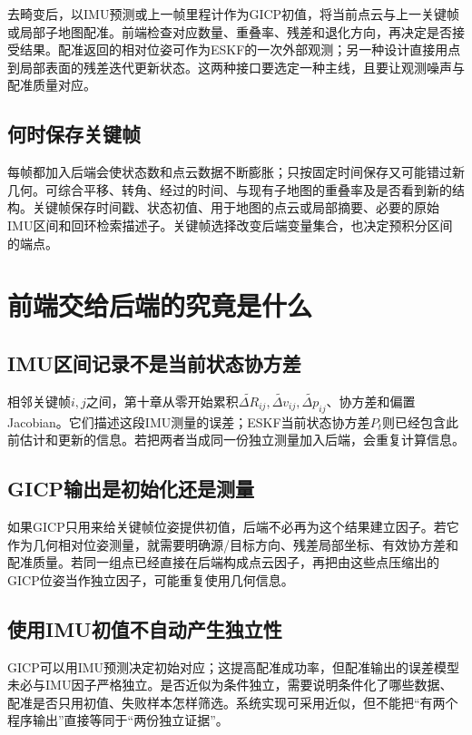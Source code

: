 去畸变后，以IMU预测或上一帧里程计作为GICP初值，将当前点云与上一关键帧或局部子地图配准。前端检查对应数量、重叠率、残差和退化方向，再决定是否接受结果。配准返回的相对位姿可作为ESKF的一次外部观测；另一种设计直接用点到局部表面的残差迭代更新状态。这两种接口要选定一种主线，且要让观测噪声与配准质量对应。

\subsection{何时保存关键帧}

每帧都加入后端会使状态数和点云数据不断膨胀；只按固定时间保存又可能错过新几何。可综合平移、转角、经过的时间、与现有子地图的重叠率及是否看到新的结构。关键帧保存时间戳、状态初值、用于地图的点云或局部摘要、必要的原始IMU区间和回环检索描述子。关键帧选择改变后端变量集合，也决定预积分区间的端点。

\section{前端交给后端的究竟是什么}

\subsection{IMU区间记录不是当前状态协方差}

相邻关键帧$i,j$之间，第十章从零开始累积$\widetilde{\Delta R}_{ij},\widetilde{\Delta v}_{ij},\widetilde{\Delta p}_{ij}$、协方差和偏置Jacobian。它们描述这段IMU测量的误差；ESKF当前状态协方差$P_t$则已经包含此前估计和更新的信息。若把两者当成同一份独立测量加入后端，会重复计算信息。

\subsection{GICP输出是初始化还是测量}

如果GICP只用来给关键帧位姿提供初值，后端不必再为这个结果建立因子。若它作为几何相对位姿测量，就需要明确源/目标方向、残差局部坐标、有效协方差和配准质量。若同一组点已经直接在后端构成点云因子，再把由这些点压缩出的GICP位姿当作独立因子，可能重复使用几何信息。

\subsection{使用IMU初值不自动产生独立性}

GICP可以用IMU预测决定初始对应；这提高配准成功率，但配准输出的误差模型未必与IMU因子严格独立。是否近似为条件独立，需要说明条件化了哪些数据、配准是否只用初值、失败样本怎样筛选。系统实现可采用近似，但不能把“有两个程序输出”直接等同于“两份独立证据”。

